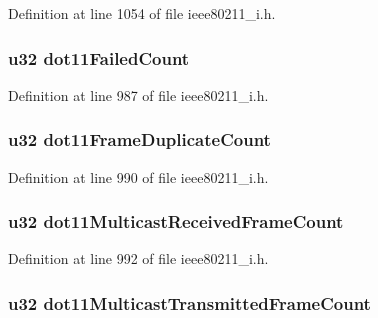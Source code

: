 Definition at line 1054 of file ieee80211\-\_\-i.\-h.

\hypertarget{structieee80211__local_ab942895683b0fe90f7d2a8bd1eadb04c}{
\subsubsection[{dot11\-Failed\-Count}]{\setlength{\rightskip}{0pt plus 5cm}u32 dot11\-Failed\-Count}}\label{structieee80211__local_ab942895683b0fe90f7d2a8bd1eadb04c}


Definition at line 987 of file ieee80211\-\_\-i.\-h.

\hypertarget{structieee80211__local_a13a04493892b47783b35445d32ad0aca}{
\subsubsection[{dot11\-Frame\-Duplicate\-Count}]{\setlength{\rightskip}{0pt plus 5cm}u32 dot11\-Frame\-Duplicate\-Count}}\label{structieee80211__local_a13a04493892b47783b35445d32ad0aca}


Definition at line 990 of file ieee80211\-\_\-i.\-h.

\hypertarget{structieee80211__local_ae2b04efb04664b259f8e6913707578ac}{
\subsubsection[{dot11\-Multicast\-Received\-Frame\-Count}]{\setlength{\rightskip}{0pt plus 5cm}u32 dot11\-Multicast\-Received\-Frame\-Count}}\label{structieee80211__local_ae2b04efb04664b259f8e6913707578ac}


Definition at line 992 of file ieee80211\-\_\-i.\-h.

\hypertarget{structieee80211__local_a3ad6d0afa55ad58821a1c316dc9909ca}{
\subsubsection[{dot11\-Multicast\-Transmitted\-Frame\-Count}]{\setlength{\rightskip}{0pt plus 5cm}u32 dot11\-Multicast\-Transmitted\-Frame\-Count}}\label{structieee80211__local_a3ad6d0afa55ad58821a1c316dc9909ca}



